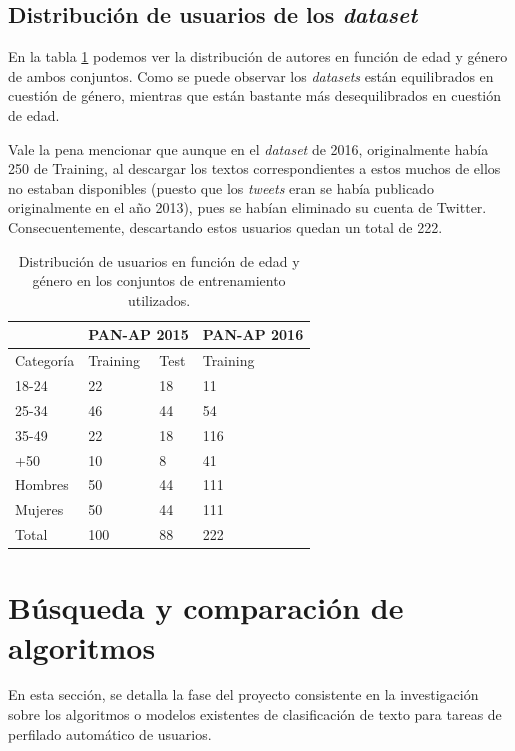   \subsection{Distribución de usuarios de los \textit{dataset}}

   En la tabla \ref{tab:datasets_edad} podemos ver la distribución de autores en función de edad y género de ambos conjuntos. Como se puede observar los \textit{datasets} están equilibrados en cuestión de género, mientras que están bastante más desequilibrados en cuestión de edad.
   
   Vale la pena mencionar que aunque en el \textit{dataset} de 2016, originalmente había 250 de Training, al descargar los textos correspondientes a estos muchos de ellos no estaban disponibles (puesto que los \textit{tweets} eran se había publicado originalmente en el año 2013), pues se habían eliminado su cuenta de Twitter. Consecuentemente, descartando estos usuarios quedan un total de 222.
   \begin{table}[hp!]
    \centering
    \begin{tabular}{|l|ll|l|}
        \rowcolor{udcpink!25}
        \hhline{~|---}
        \multicolumn{1}{c|}{\cellcolor{white}} & \multicolumn{2}{c|}{\textbf{PAN-AP 2015}} & \textbf{PAN-AP 2016}\\ \hline
        Categoría & Training & Test & Training \\ \hline
        18-24 & 22 & 18 & 11\\
        25-34 & 46 & 44 & 54\\
        35-49 & 22 & 18 & 116\\
        +50 & 10 & 8 & 41\\ \hline
        Hombres & 50 & 44 & 111\\
        Mujeres & 50 & 44 & 111\\ \hline
        Total & 100 & 88 & 222\\ \hline  
    \end{tabular}%
    \caption{Distribución de usuarios en función de edad y género en los conjuntos de entrenamiento utilizados.}
    \label{tab:datasets_edad}
\end{table}

\section{Búsqueda y comparación de algoritmos}
En esta sección, se detalla la fase del proyecto consistente en 
 la investigación sobre los algoritmos o modelos existentes de clasificación de texto para tareas de perfilado automático de usuarios.
 

